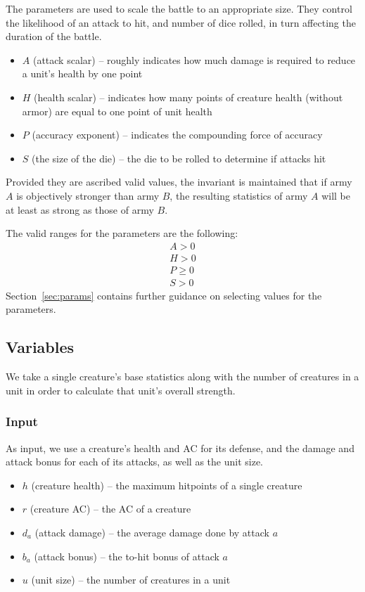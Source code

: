 \documentclass[twocolumn]{article}
\begin{document}
The parameters are used to scale the battle to an appropriate size.
They control the likelihood of an attack to hit,
and number of dice rolled,
in turn affecting the duration of the battle.

\begin{itemize}
    \item $A$ (attack scalar) -- roughly indicates how much damage is required to reduce a unit's health by one point
    \item $H$ (health scalar) -- indicates how many points of creature health (without armor) are equal to one point of unit health
    \item $P$ (accuracy exponent) -- indicates the compounding force of accuracy
    \item $S$ (the size of the die) -- the die to be rolled to determine if attacks hit
\end{itemize}

Provided they are ascribed valid values,
the invariant is maintained that if army $A$ is objectively stronger than army $B$,
the resulting statistics of army $A$ will be at least as strong as those of army $B$.

The valid ranges for the parameters are the following:
\begin{align*}
    A > 0 \\
    H > 0 \\
    P \geq 0 \\
    S > 0
\end{align*}
Section~\ref{sec:params} contains further guidance on selecting values for the parameters.

\subsection{Variables}

We take a single creature's base statistics along with the number of creatures in a unit
in order to calculate that unit's overall strength.

\subsubsection{Input}

As input, we use a creature's health and AC for its defense,
and the damage and attack bonus for each of its attacks,
as well as the unit size.

\begin{itemize}
    \item $h$ (creature health) -- the maximum hitpoints of a single creature
    \item $r$ (creature AC) -- the AC of a creature
    \item $d_a$ (attack damage) -- the average damage done by attack $a$
    \item $b_a$ (attack bonus) -- the to-hit bonus of attack $a$
    \item $u$ (unit size) -- the number of creatures in a unit
\end{itemize}
\end{document}
